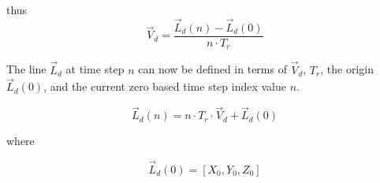 
thus
\begin{equation}
\vec{V}_d = \frac{\vec{L}_d(n) - \vec{L}_d(0)}{n \cdot T_r}
\end{equation}

The line $\vec{L}_d$ at time step $n$ can now be defined in terms of $\vec{V}_d$, $T_r$, the origin $\vec{L}_d(0)$, and the current zero based time step index value $n$.

\begin{equation}
\vec{L}_d(n) = n \cdot T_r \cdot \vec{V}_d + \vec{L}_d(0)
\end{equation}







where 

\begin{equation}
\vec{L}_d(0) = \left[X_0, Y_0, Z_0\right]
\end{equation}


